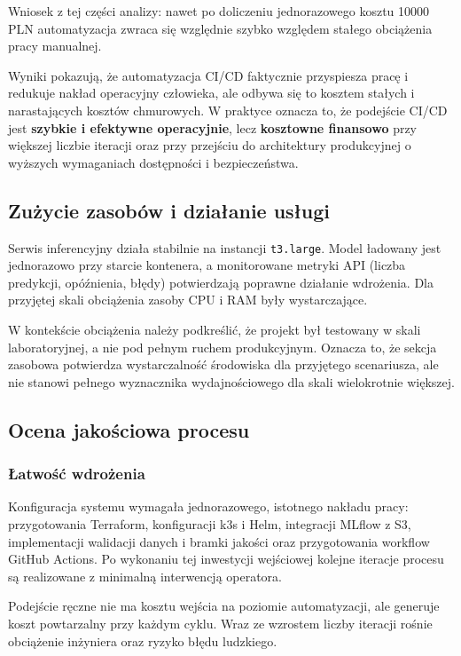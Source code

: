 Wniosek z tej części analizy: nawet po doliczeniu jednorazowego kosztu 10000 PLN automatyzacja zwraca się względnie szybko względem stałego obciążenia pracy manualnej.

Wyniki pokazują, że automatyzacja CI/CD faktycznie przyspiesza pracę i redukuje nakład operacyjny człowieka, ale odbywa się to kosztem stałych i narastających kosztów chmurowych. W praktyce oznacza to, że podejście CI/CD jest \textbf{szybkie i efektywne operacyjnie}, lecz \textbf{kosztowne finansowo} przy większej liczbie iteracji oraz przy przejściu do architektury produkcyjnej o wyższych wymaganiach dostępności i bezpieczeństwa.

\subsection{Zużycie zasobów i działanie usługi}
\label{subsec:zasoby}

Serwis inferencyjny działa stabilnie na instancji \texttt{t3.large}. Model ładowany jest jednorazowo przy starcie kontenera, a monitorowane metryki API (liczba predykcji, opóźnienia, błędy) potwierdzają poprawne działanie wdrożenia. Dla przyjętej skali obciążenia zasoby CPU i RAM były wystarczające.

W kontekście obciążenia należy podkreślić, że projekt był testowany w skali laboratoryjnej, a nie pod pełnym ruchem produkcyjnym. Oznacza to, że sekcja zasobowa potwierdza wystarczalność środowiska dla przyjętego scenariusza, ale nie stanowi pełnego wyznacznika wydajnościowego dla skali wielokrotnie większej.

\subsection{Ocena jakościowa procesu}

\subsubsection{Łatwość wdrożenia}

Konfiguracja systemu wymagała jednorazowego, istotnego nakładu pracy: przygotowania Terraform, konfiguracji k3s i Helm, integracji MLflow z S3, implementacji walidacji danych i bramki jakości oraz przygotowania workflow GitHub Actions. Po wykonaniu tej inwestycji wejściowej kolejne iteracje procesu są realizowane z minimalną interwencją operatora.

Podejście ręczne nie ma kosztu wejścia na poziomie automatyzacji, ale generuje koszt powtarzalny przy każdym cyklu. Wraz ze wzrostem liczby iteracji rośnie obciążenie inżyniera oraz ryzyko błędu ludzkiego.

